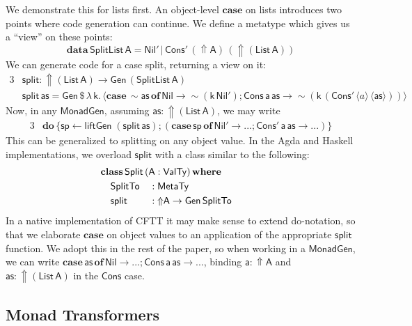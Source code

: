 \documentclass[acmsmall,screen,review,anonymous]{acmart}
\newcommand{\mit}[1]{{\mathsf{#1}}}
\newcommand{\msf}[1]{{\mathsf{#1}}}
\newcommand{\mbf}[1]{{\mathbf{#1}}}
\newcommand{\bs}[1]{\boldsymbol{#1}}
\newcommand{\mdo}{\mbf{do}\,}
\newcommand{\ind}{\hspace{1em}}
\newcommand{\lam}{\lambda\,}
\newcommand{\data}{\mbf{data}\,}
\newcommand{\where}{\mbf{where}}
\newcommand{\of}{\mbf{of}\,}
\newcommand{\vas}{\mathsf{as}}
\newcommand{\vk}{\mathsf{k}}
\newcommand{\vA}{\mathsf{A}}
\newcommand{\va}{\mathsf{a}}
\newcommand{\List}{\msf{List}}
\newcommand{\Nil}{\msf{Nil}}
\newcommand{\Cons}{\msf{Cons}}
\newcommand{\fro}{\leftarrow}
\newcommand{\case}{\mbf{case\,}}
\newcommand{\Lift}{{\Uparrow}}
\newcommand{\Up}{{\Uparrow}}
\newcommand{\spl}{{\bs{\sim}}}
\newcommand{\ql}{{\bs{\langle}}}
\newcommand{\qr}{{\bs{\rangle}}}
\newcommand{\MTy}{\msf{MetaTy}}
\newcommand{\VTy}{\msf{ValTy}}
\theoremstyle{remark}
\newcommand{\tyclass}{\mbf{class}}
\newcommand{\Gen}{\msf{Gen}}
\newcommand{\qt}[1]{\ql#1\qr}
\newcommand{\liftGen}{\mit{liftGen}}
\newcommand{\MonadGen}{\msf{MonadGen}}
\newcommand{\dlr}{\,\$\,}
\begin{document}
We demonstrate this for lists first. An object-level $\mbf{case}$ on lists introduces
two points where code generation can continue. We define a metatype which gives
us a ``view'' on these points:
\[ \data \msf{SplitList}\,\vA = \Nil'\,|\,\Cons'\,(\Up \vA)\,(\Up (\List\,\vA)) \]
We can generate code for a case split, returning a view on it:
\begin{alignat*}{3}
  &\mit{split} : \Up (\List\,\vA) \to \Gen\,(\msf{SplitList}\,\vA)\\
  &\mit{split}\,\vas = \Gen \dlr \lam \vk.\,\qt{\case \spl \vas\,\of \Nil \to \spl(\vk\,\Nil'); \Cons\,\va\,\vas \to \spl(\vk\,(\Cons'\,\qt{a}\,\qt{\vas}))}
\end{alignat*}
Now, in any $\MonadGen$, assuming $\vas : \Up(\List\,\vA)$, we may write
\begin{alignat*}{3}
  &\mdo \{\mit{sp} \fro \liftGen\;(\!\mit{split}\,\vas);(\case \mit{sp}\,\of \Nil' \to ...;\Cons'\,\va\,\vas \to ...)\}
\end{alignat*}
This can be generalized to splitting on any object value. In the Agda and
Haskell implementations, we overload $\mit{split}$ with a class similar to the
following:
\begin{alignat*}{3}
  & \hspace{-2em}\mathrlap{\tyclass\,\mit{Split}\,(\vA : \VTy)\,\where}\\
  & \hspace{-2em}\ind \mit{SplitTo} &&: \MTy \\
  & \hspace{-2em}\ind \mit{split}   &&: \Lift \vA \to \Gen\,\mit{SplitTo}
\end{alignat*}
In a native implementation of CFTT it may make sense to extend do-notation, so
that we elaborate $\mbf{case}$ on object values to an application of the
appropriate $\mit{split}$ function. We adopt this in the rest of the paper, so
when working in a $\MonadGen$, we can write $\case \vas\,\of \Nil \to ...;
\Cons\,\va\,\vas \to ...$, binding $\va : \Up \vA$ and $\vas : \Up(\List\,\vA)$
in the $\Cons$ case.

\subsection{Monad Transformers}\label{monad-transformers}
\end{document}
